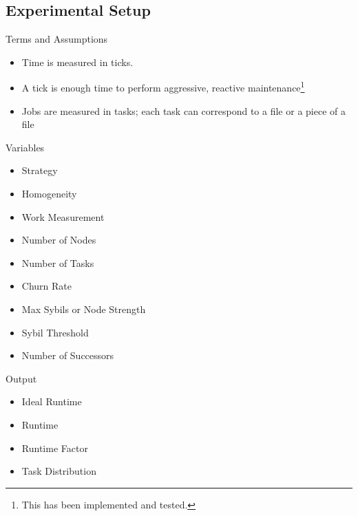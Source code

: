 \documentclass[11pt]{beamer}
\begin{document}
\subsection{Experimental Setup}
\begin{frame}{Terms and Assumptions}
	\begin{itemize}
		
		\item Time is measured in ticks.
		\item A tick is enough time to perform aggressive, reactive maintenance\footnote{This has been implemented and tested.}
		\item Jobs are measured in tasks; each task can correspond to a file or a piece of a file
		
	\end{itemize}
\end{frame}




\begin{frame}{Variables}
	\begin{itemize}
		
		\item Strategy
		\item Homogeneity 
		\item Work Measurement
		\item Number of Nodes
		\item Number of Tasks
		\item Churn Rate 
		\item Max Sybils or Node Strength
		\item Sybil Threshold 
		\item Number of Successors
	\end{itemize}
\end{frame}


\begin{frame}{Output}
	\begin{itemize}
		
		\item Ideal Runtime
		\item Runtime
		\item Runtime Factor
		\item Task Distribution
	\end{itemize}
\end{frame}

\end{document}
